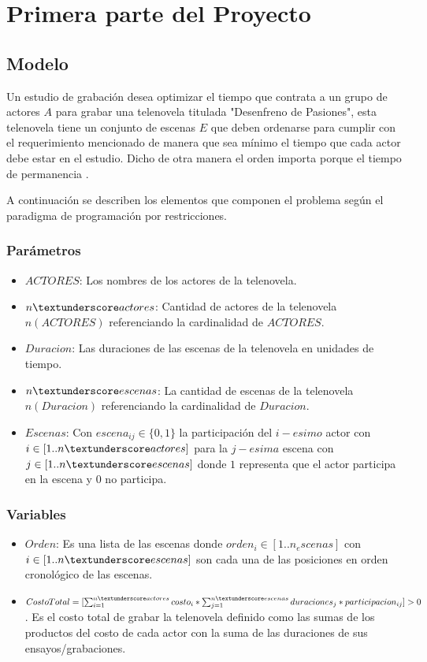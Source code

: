\documentclass{article}
\begin{document}

\section{Primera parte del Proyecto}
\subsection{Modelo}
Un estudio de grabación desea optimizar el tiempo que contrata a un grupo de actores $A$ para grabar una telenovela titulada "Desenfreno de Pasiones", esta telenovela tiene un conjunto de escenas $E$ que deben ordenarse para cumplir con el requerimiento mencionado de manera que sea mínimo el tiempo que cada actor debe estar en el estudio. Dicho de otra manera el orden importa porque el tiempo de permanencia . \newline

A continuación se describen los elementos que componen el problema según el paradigma de programación por restricciones.

\subsubsection{Parámetros}
\begin{itemize}
    \item $ACTORES$: Los nombres de los actores de la telenovela.
    \item $n\textunderscore actores$: Cantidad de actores de la telenovela $n(ACTORES)$ referenciando la cardinalidad de $ACTORES$.
    \item $Duracion$: Las duraciones de las escenas de la telenovela en unidades de tiempo.
    \item $n\textunderscore escenas$: La cantidad de escenas de la telenovela $n(Duracion)$ referenciando la cardinalidad de $Duracion$.
    \item $Escenas$: Con $escena_{ij} \in \{0,1\}$ la participación del $i-esimo$ actor con $i \in [1..n\textunderscore actores]$ para la $j-esima$ escena con $j \in [1..n\textunderscore escenas]$ donde $1$ representa que el actor participa en la escena y $0$ no participa.    
\end{itemize}

\subsubsection{Variables}
\begin{itemize}
    \item $Orden$: Es una lista de las escenas donde $orden_i \in [1..n_escenas]$ con $i \in [1..n\textunderscore escenas]$ son cada una de las posiciones en orden cronológico de las escenas.
    \item $CostoTotal = [\sum_{i=1}^{n\textunderscore actores} costo_i * \sum_{j=1}^{n\textunderscore escenas}duraciones_j * participacion_{ij} ]   > 0$. \newline\newline
          Es el costo total de grabar la telenovela definido como las sumas de los productos del costo de cada actor con la suma de las duraciones de sus ensayos/grabaciones.
\end{itemize}
\end{document}
